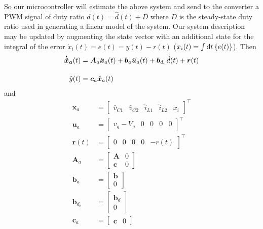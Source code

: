 So our microcontroller will estimate the above system and send to the converter a PWM signal of duty ratio $d(t) = \hat{d}(t) + D$ where $D$ is the steady-state duty ratio used in generating a linear model of the system.
\newpar
Our system description may be updated by augmenting the state vector with an additional state for the integral of the error $\dot{x}_i(t) = e(t) = y(t) - r(t)$ ($x_i(t) = \int \mathrm{d}t \left\{e(t)\right\}$). Then
\begin{align*}
\boldsymbol{\dispdot[0mu]{\hat{x}}_a}(t) &= \boldsymbol{A}_a\hat{\boldsymbol{x}}_a(t) + \boldsymbol{b}_a \hat{\boldsymbol{u}}_a(t) + \boldsymbol{b}_{d_a} \hat{d}(t) + \boldsymbol{r}(t)
\\[11pt]
\hat{y}(t) &= \boldsymbol{c}_a \hat{\boldsymbol{x}}_a(t)
\end{align*}
and
\begingroup
\allowdisplaybreaks
\begin{align}
\boldsymbol{x}_a &=
\begin{bmatrix}
\hat{v}_{C1} & \hat{v}_{C2} & \hat{i}_{L1} & \hat{i}_{L2} & x_i
\end{bmatrix}^\intercal
\\[11pt]
\boldsymbol{u}_a &=
\begin{bmatrix}
v_g - V_g & 0 & 0 & 0 & 0
\end{bmatrix}^\intercal
\\[11pt]
\boldsymbol{r}(t) &=
\begin{bmatrix}
0 & 0 & 0 & 0 & \minus r(t)
\end{bmatrix}^\intercal
\\[11pt]
\boldsymbol{A}_a &=
\begin{bmatrix}
\boldsymbol{A} & 0\\
\boldsymbol{c} & 0
\end{bmatrix}
\label{eqn:augmentedA}
\\[11pt]
\boldsymbol{b}_a
&=
\begin{bmatrix}
\boldsymbol{b} \\ 0
\end{bmatrix}
\\[11pt]
\boldsymbol{b}_{d_a}
&=
\begin{bmatrix}
\boldsymbol{b}_d \\ 0
\end{bmatrix}
\label{eqn:augmentedbD}
\\[11pt]
\boldsymbol{c}_a
&=
\begin{bmatrix}
\boldsymbol{c} & 0
\end{bmatrix}
\end{align}
\endgroup
